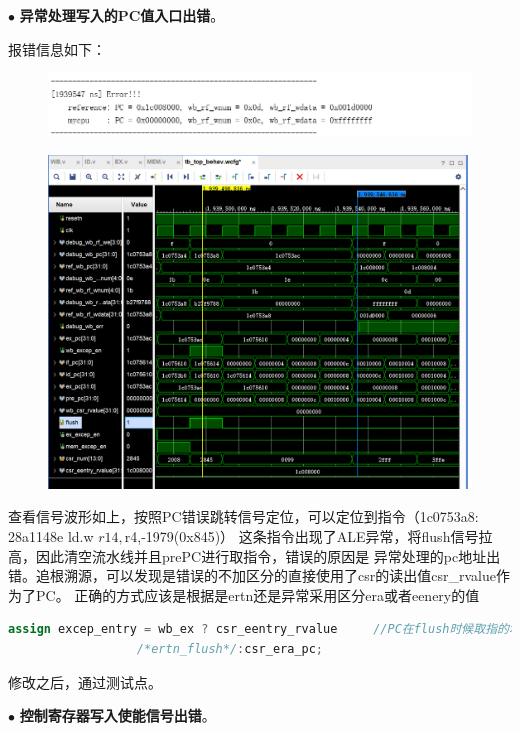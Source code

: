 \documentclass[11pt]{article}
\begin{document}
          \noindent
          $\bullet$
          \textbf{异常处理写入的PC值入口出错}。
        
          报错信息如下：
          \begin{figure}[H]
            \centering
            \includegraphics[width=15cm]{fig/19.png}
          \end{figure}
          \begin{figure}[H]
            \centering
            \includegraphics[width=15cm]{fig/20.png}
          \end{figure}
          查看信号波形如上，按照PC错误跳转信号定位，可以定位到指令（1c0753a8:	28a1148e 	ld.w	$r14,$r4,-1979(0x845)）
          这条指令出现了ALE异常，将flush信号拉高，因此清空流水线并且prePC进行取指令，错误的原因是
          异常处理的pc地址出错。追根溯源，可以发现是错误的不加区分的直接使用了csr的读出值csr_rvalue作为了PC。
          正确的方式应该是根据是ertn还是异常采用区分era或者eenery的值
           \begin{lstlisting}[language=verilog]
            assign excep_entry = wb_ex ? csr_eentry_rvalue     //PC在flush时候取指的地址
                  /*ertn_flush*/:csr_era_pc;
          \end{lstlisting}
          修改之后，通过测试点。

          \noindent
          $\bullet$
          \textbf{控制寄存器写入使能信号出错}。
        
\end{document}

